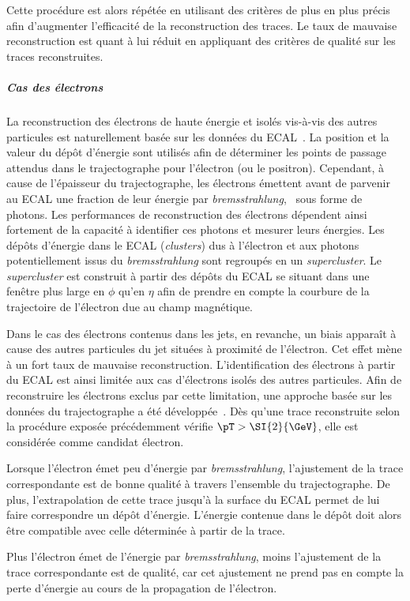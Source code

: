 Cette procédure est alors répétée en utilisant des critères de plus en plus précis afin d'augmenter l'efficacité de la reconstruction des traces.
Le taux de mauvaise reconstruction est quant à lui réduit en appliquant des critères de qualité sur les traces reconstruites.
\subparagraph{Cas des électrons}
La reconstruction des électrons de haute énergie et isolés vis-à-vis des autres particules est naturellement basée sur les données du ECAL~\cite{electron_reco_8tev}.
La position et la valeur du dépôt d'énergie sont utilisés afin de déterminer les points de passage attendus dans le trajectographe pour l'électron (ou le positron).
Cependant, à cause de l'épaisseur du trajectographe, les électrons émettent avant de parvenir au ECAL une fraction de leur énergie par \emph{bremsstrahlung}, \ie\ sous forme de photons.
Les performances de reconstruction des électrons dépendent ainsi fortement de la capacité à identifier ces photons et mesurer leurs énergies.
Les dépôts d'énergie dans le ECAL (\emph{clusters}) dus à l'électron et aux photons potentiellement issus du \emph{bremsstrahlung} sont regroupés en un \emph{supercluster}.
Le \emph{supercluster} est construit à partir des dépôts du ECAL se situant dans une fenêtre plus large en $\phi$ qu'en $\eta$ afin de prendre en compte la courbure de la trajectoire de l'électron due au champ magnétique.
\par
Dans le cas des électrons contenus dans les jets, en revanche, un biais apparaît à cause des autres particules du jet situées à proximité de l'électron.
Cet effet mène à un fort taux de mauvaise reconstruction.
L'identification des électrons à partir du ECAL est ainsi limitée aux cas d'électrons isolés des autres particules.
Afin de reconstruire les électrons exclus par cette limitation, une approche basée sur les données du trajectographe a été développée~\cite{particle-flow}.
Dès qu'une trace reconstruite selon la procédure exposée précédemment vérifie $\pT>\SI{2}{\GeV}$, elle est considérée comme candidat électron.
\par
Lorsque l'électron émet peu d'énergie par \emph{bremsstrahlung}, l'ajustement de la trace correspondante est de bonne qualité à travers l'ensemble du trajectographe.
De plus, l'extrapolation de cette trace jusqu'à la surface du ECAL permet de lui faire correspondre un dépôt d'énergie.
L'énergie contenue dans le dépôt doit alors être compatible avec celle déterminée à partir de la trace.
\par
Plus l'électron émet de l'énergie par \emph{bremsstrahlung}, moins l'ajustement de la trace correspondante est de qualité, car cet ajustement ne prend pas en compte la perte d'énergie au cours de la propagation de l'électron.
